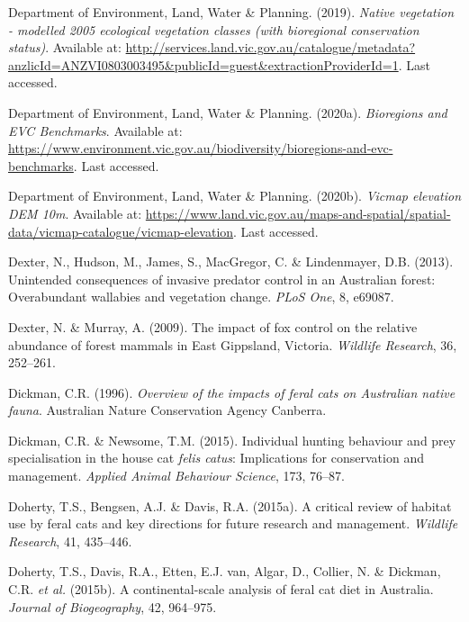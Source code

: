 \documentclass[11pt,a4paper,titlepage,twoside,openright]{style/unimelbthesis}
\begin{document}
\begin{mainmatter}
\leavevmode\hypertarget{ref-NV2005_EVCBCS}{}%
Department of Environment, Land, Water \& Planning. (2019). \emph{Native vegetation - modelled 2005 ecological vegetation classes (with bioregional conservation status)}. Available at: \url{http://services.land.vic.gov.au/catalogue/metadata?anzlicId=ANZVI0803003495\&publicId=guest\&extractionProviderId=1}. Last accessed.

\leavevmode\hypertarget{ref-delwp2020bioregions}{}%
Department of Environment, Land, Water \& Planning. (2020a). \emph{Bioregions and EVC Benchmarks}. Available at: \url{https://www.environment.vic.gov.au/biodiversity/bioregions-and-evc-benchmarks}. Last accessed.

\leavevmode\hypertarget{ref-delwp2020elevation}{}%
Department of Environment, Land, Water \& Planning. (2020b). \emph{Vicmap elevation DEM 10m}. Available at: \url{https://www.land.vic.gov.au/maps-and-spatial/spatial-data/vicmap-catalogue/vicmap-elevation}. Last accessed.

\leavevmode\hypertarget{ref-dexter2013unintended}{}%
Dexter, N., Hudson, M., James, S., MacGregor, C. \& Lindenmayer, D.B. (2013). Unintended consequences of invasive predator control in an Australian forest: Overabundant wallabies and vegetation change. \emph{PLoS One}, 8, e69087.

\leavevmode\hypertarget{ref-dexter2009impact}{}%
Dexter, N. \& Murray, A. (2009). The impact of fox control on the relative abundance of forest mammals in East Gippsland, Victoria. \emph{Wildlife Research}, 36, 252--261.

\leavevmode\hypertarget{ref-dickman1996overview}{}%
Dickman, C.R. (1996). \emph{Overview of the impacts of feral cats on Australian native fauna}. Australian Nature Conservation Agency Canberra.

\leavevmode\hypertarget{ref-dickman2015individual}{}%
Dickman, C.R. \& Newsome, T.M. (2015). Individual hunting behaviour and prey specialisation in the house cat \emph{felis catus}: Implications for conservation and management. \emph{Applied Animal Behaviour Science}, 173, 76--87.

\leavevmode\hypertarget{ref-doherty2015critical}{}%
Doherty, T.S., Bengsen, A.J. \& Davis, R.A. (2015a). A critical review of habitat use by feral cats and key directions for future research and management. \emph{Wildlife Research}, 41, 435--446.

\leavevmode\hypertarget{ref-doherty2015continental}{}%
Doherty, T.S., Davis, R.A., Etten, E.J. van, Algar, D., Collier, N. \& Dickman, C.R. \emph{et al.} (2015b). A continental-scale analysis of feral cat diet in Australia. \emph{Journal of Biogeography}, 42, 964--975.


\end{mainmatter}
\end{document}
